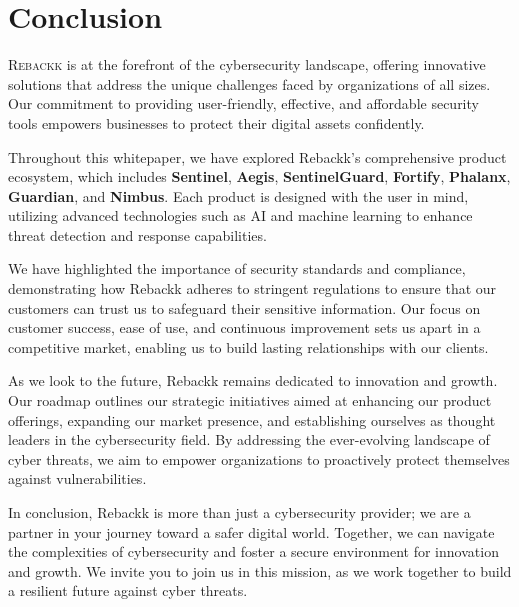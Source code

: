 \chapter{Conclusion}

\lettrine{R}{ebackk} is at the forefront of the cybersecurity landscape, offering innovative solutions that address the unique challenges faced by organizations of all sizes. Our commitment to providing user-friendly, effective, and affordable security tools empowers businesses to protect their digital assets confidently.

Throughout this whitepaper, we have explored Rebackk’s comprehensive product ecosystem, which includes \textbf{Sentinel}, \textbf{Aegis}, \textbf{SentinelGuard}, \textbf{Fortify}, \textbf{Phalanx}, \textbf{Guardian}, and \textbf{Nimbus}. Each product is designed with the user in mind, utilizing advanced technologies such as AI and machine learning to enhance threat detection and response capabilities.

We have highlighted the importance of security standards and compliance, demonstrating how Rebackk adheres to stringent regulations to ensure that our customers can trust us to safeguard their sensitive information. Our focus on customer success, ease of use, and continuous improvement sets us apart in a competitive market, enabling us to build lasting relationships with our clients.

As we look to the future, Rebackk remains dedicated to innovation and growth. Our roadmap outlines our strategic initiatives aimed at enhancing our product offerings, expanding our market presence, and establishing ourselves as thought leaders in the cybersecurity field. By addressing the ever-evolving landscape of cyber threats, we aim to empower organizations to proactively protect themselves against vulnerabilities.

In conclusion, Rebackk is more than just a cybersecurity provider; we are a partner in your journey toward a safer digital world. Together, we can navigate the complexities of cybersecurity and foster a secure environment for innovation and growth. We invite you to join us in this mission, as we work together to build a resilient future against cyber threats.